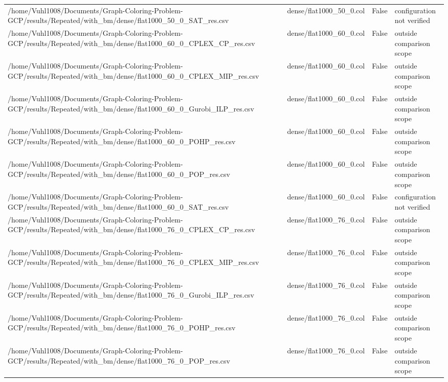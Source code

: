 \begin{table}[htbp]
\begin{tabular}{llll}
/home/Vuhl1008/Documents/Graph-Coloring-Problem-GCP/results/Repeated/with\_bm/dense/flat1000\_50\_0\_SAT\_res.csv & dense/flat1000\_50\_0.col & False & configuration not verified \\
/home/Vuhl1008/Documents/Graph-Coloring-Problem-GCP/results/Repeated/with\_bm/dense/flat1000\_60\_0\_CPLEX\_CP\_res.csv & dense/flat1000\_60\_0.col & False & outside comparison scope \\
/home/Vuhl1008/Documents/Graph-Coloring-Problem-GCP/results/Repeated/with\_bm/dense/flat1000\_60\_0\_CPLEX\_MIP\_res.csv & dense/flat1000\_60\_0.col & False & outside comparison scope \\
/home/Vuhl1008/Documents/Graph-Coloring-Problem-GCP/results/Repeated/with\_bm/dense/flat1000\_60\_0\_Gurobi\_ILP\_res.csv & dense/flat1000\_60\_0.col & False & outside comparison scope \\
/home/Vuhl1008/Documents/Graph-Coloring-Problem-GCP/results/Repeated/with\_bm/dense/flat1000\_60\_0\_POHP\_res.csv & dense/flat1000\_60\_0.col & False & outside comparison scope \\
/home/Vuhl1008/Documents/Graph-Coloring-Problem-GCP/results/Repeated/with\_bm/dense/flat1000\_60\_0\_POP\_res.csv & dense/flat1000\_60\_0.col & False & outside comparison scope \\
/home/Vuhl1008/Documents/Graph-Coloring-Problem-GCP/results/Repeated/with\_bm/dense/flat1000\_60\_0\_SAT\_res.csv & dense/flat1000\_60\_0.col & False & configuration not verified \\
/home/Vuhl1008/Documents/Graph-Coloring-Problem-GCP/results/Repeated/with\_bm/dense/flat1000\_76\_0\_CPLEX\_CP\_res.csv & dense/flat1000\_76\_0.col & False & outside comparison scope \\
/home/Vuhl1008/Documents/Graph-Coloring-Problem-GCP/results/Repeated/with\_bm/dense/flat1000\_76\_0\_CPLEX\_MIP\_res.csv & dense/flat1000\_76\_0.col & False & outside comparison scope \\
/home/Vuhl1008/Documents/Graph-Coloring-Problem-GCP/results/Repeated/with\_bm/dense/flat1000\_76\_0\_Gurobi\_ILP\_res.csv & dense/flat1000\_76\_0.col & False & outside comparison scope \\
/home/Vuhl1008/Documents/Graph-Coloring-Problem-GCP/results/Repeated/with\_bm/dense/flat1000\_76\_0\_POHP\_res.csv & dense/flat1000\_76\_0.col & False & outside comparison scope \\
/home/Vuhl1008/Documents/Graph-Coloring-Problem-GCP/results/Repeated/with\_bm/dense/flat1000\_76\_0\_POP\_res.csv & dense/flat1000\_76\_0.col & False & outside comparison scope \\

\end{tabular}
\end{table}
